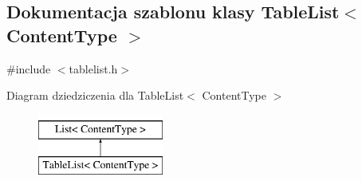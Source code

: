 \hypertarget{class_table_list}{\subsection{Dokumentacja szablonu klasy Table\-List$<$ Content\-Type $>$}
\label{class_table_list}
}


{\ttfamily \#include $<$tablelist.\-h$>$}

Diagram dziedziczenia dla Table\-List$<$ Content\-Type $>$\begin{figure}[H]
\begin{center}
\leavevmode
\includegraphics[height=2.000000cm]{class_table_list}
\end{center}
\end{figure}
